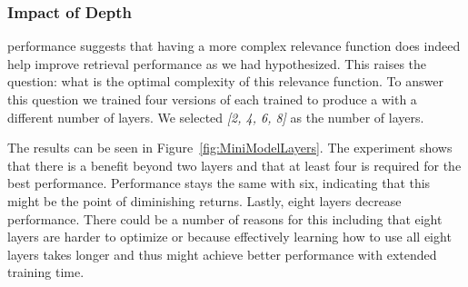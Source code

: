 \documentclass[sigconf,]{acmart}
\begin{document}
\begin{table}
\centering
\caption{Average query latency and nDCG@10 on TREC DL '19 and '20 with efficient search. Efficient 1 uses parameters ($\Tilde{C}=10000$, $nCandidates=64$, $maxIter=16$), Efficient 2 uses parameters ($\Tilde{C}=100000$, $nCandidates=328$, $maxIter=20$). All model inference was performed on an NVIDIA L40S with BF16 precision.} \label{tab:ApproximateSearchResults}
\vspace{-8pt}
\end{table}





\subsubsection{Impact of \mininame{} Depth}
\name{} performance suggests that having a more complex relevance function does indeed help improve retrieval performance as we had hypothesized. This raises the question: what is the optimal complexity of this relevance function. To answer this question we trained four versions of \name{} each trained to produce a \mininame{} with a different number of layers. We selected \textit{[2, 4, 6, 8]} as the number of \mininame{} layers.

The results can be seen in Figure~\ref{fig:MiniModelLayers}. The experiment shows that there is a benefit beyond two layers and that at least four is required for the best performance. Performance stays the same with six, indicating that this might be the point of diminishing returns. Lastly, eight layers decrease performance. There could be a number of reasons for this including that eight layers are harder to optimize or because effectively learning how to use all eight layers takes longer and thus might achieve better performance with extended training time.
\end{document}
